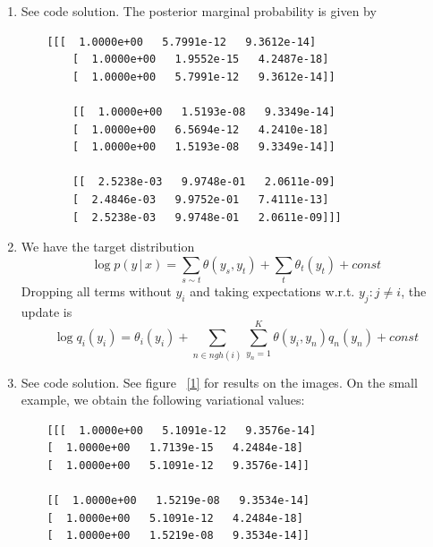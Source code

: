 \documentclass[submit]{harvardml}
\newcommand{\given}{\,|\,}
\theoremstyle{plain}
\begin{document}
\begin{enumerate}
	\item See code solution. The posterior marginal probability is given by
	
	\begin{verbatim}
	[[[  1.0000e+00   5.7991e-12   9.3612e-14]
		[  1.0000e+00   1.9552e-15   4.2487e-18]
		[  1.0000e+00   5.7991e-12   9.3612e-14]]
		
		[[  1.0000e+00   1.5193e-08   9.3349e-14]
		[  1.0000e+00   6.5694e-12   4.2410e-18]
		[  1.0000e+00   1.5193e-08   9.3349e-14]]
		
		[[  2.5238e-03   9.9748e-01   2.0611e-09]
		[  2.4846e-03   9.9752e-01   7.4111e-13]
		[  2.5238e-03   9.9748e-01   2.0611e-09]]]
	\end{verbatim}
	
	\item We have the target distribution
	\[
	\log p(y\given x) = \sum_{s\sim t} \theta(y_s, y_t) + \sum_{t} \theta_t(y_t) + const
	\]
	Dropping all terms without $y_i$ and taking expectations w.r.t. $y_j: j\neq i$, the update is
	\[
	\log q_i(y_i) = \theta_i(y_i) + \sum_{n\in ngh(i)} \sum_{y_n = 1}^K \theta(y_i, y_n) q_n(y_n) + const
	\]
	
	\item See code solution. See figure ~\ref{1} for results on the images. On the small example, we obtain the following variational values:
	
	\begin{verbatim}
	[[[  1.0000e+00   5.1091e-12   9.3576e-14]
	[  1.0000e+00   1.7139e-15   4.2484e-18]
	[  1.0000e+00   5.1091e-12   9.3576e-14]]
	
	[[  1.0000e+00   1.5219e-08   9.3534e-14]
	[  1.0000e+00   5.1091e-12   4.2484e-18]
	[  1.0000e+00   1.5219e-08   9.3534e-14]]
	

\end{verbatim}
\end{enumerate}
\end{document}
